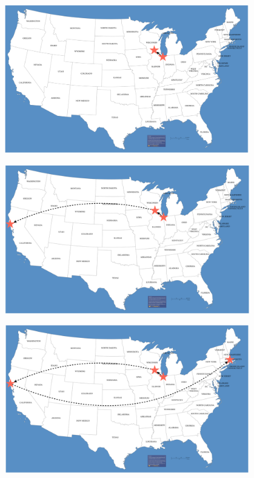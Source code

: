 \documentclass[10pt]{beamer}
\begin{document}
\begin{frame}

	\begin{center}
		\includegraphics[width=0.8\textwidth]{figures/map1.png}
	\end{center}
\end{frame}


\begin{frame}

	\begin{center}
		\includegraphics[width=0.8\textwidth]{figures/map2.png}
	\end{center}
\end{frame}


\begin{frame}

	\begin{center}
		\includegraphics[width=0.8\textwidth]{figures/map3.png}
	\end{center}
\end{frame}
\end{document}
